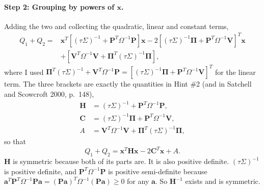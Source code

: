 \documentclass[11pt]{article}
\numberwithin{equation}{section}
\begin{document}
\paragraph{Step 2: Grouping by powers of $\bm{x}$.}
Adding the two and collecting the quadratic, linear and constant terms,
\begin{align*}
  Q_{1} + Q_{2}
  = {} & \bm{x}^{T}\left[(\tau\Sigma)^{-1} + \bm{P}^{T}\Omega^{-1}\bm{P}\right]\bm{x}
  - 2\left[(\tau\Sigma)^{-1}\bm{\Pi} + \bm{P}^{T}\Omega^{-1}\bm{V}\right]^{T}\bm{x} \\
  & + \left[\bm{V}^{T}\Omega^{-1}\bm{V} + \bm{\Pi}^{T}(\tau\Sigma)^{-1}\bm{\Pi}\right],
\end{align*}
where I used $\bm{\Pi}^{T}(\tau\Sigma)^{-1} + \bm{V}^{T}\Omega^{-1}\bm{P} = \left[(\tau\Sigma)^{-1}\bm{\Pi} + \bm{P}^{T}\Omega^{-1}\bm{V}\right]^{T}$ for the linear term. The three brackets are exactly the quantities in Hint \#2 (and in Satchell and Scowcroft 2000, p.~148),
\begin{equation}
  \begin{aligned}
  \bm{H} &= (\tau\Sigma)^{-1} + \bm{P}^{T}\Omega^{-1}\bm{P}, \\
  \bm{C} &= (\tau\Sigma)^{-1}\bm{\Pi} + \bm{P}^{T}\Omega^{-1}\bm{V}, \\
  A &= \bm{V}^{T}\Omega^{-1}\bm{V} + \bm{\Pi}^{T}(\tau\Sigma)^{-1}\bm{\Pi},
  \end{aligned}
  \label{eq:q3-HCA}
\end{equation}
so that
\begin{equation}
  Q_{1} + Q_{2} = \bm{x}^{T}\bm{H}\bm{x} - 2\bm{C}^{T}\bm{x} + A.
  \label{eq:q3-grouped}
\end{equation}
$\bm{H}$ is symmetric because both of its parts are. It is also positive definite. $(\tau\Sigma)^{-1}$ is positive definite, and $\bm{P}^{T}\Omega^{-1}\bm{P}$ is positive semi-definite because $\bm{a}^{T}\bm{P}^{T}\Omega^{-1}\bm{P}\bm{a} = (\bm{P}\bm{a})^{T}\Omega^{-1}(\bm{P}\bm{a}) \geq 0$ for any $\bm{a}$. So $\bm{H}^{-1}$ exists and is symmetric.
\end{document}

